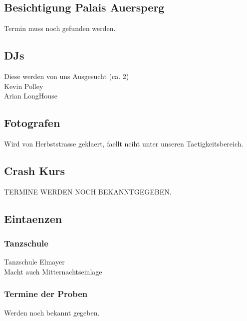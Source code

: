 \documentclass[12pt]{article}
\begin{document}
\subsection{Besichtigung Palais Auersperg}
Termin muss noch gefunden werden. 
\subsection{DJs}
Diese werden von uns Ausgesucht (ca. 2) \\
Kevin Polley \\
Arian LongHouse  \\
\subsection{Fotografen}
Wird von Herbststrasse geklaert, faellt nciht unter unseren Taetigkeitsbereich.
\subsection{Crash Kurs}
TERMINE WERDEN NOCH BEKANNTGEGEBEN.	
\subsection{Eintaenzen}
\subsubsection{Tanzschule}
Tanzschule Elmayer \\
Macht auch Mitternachtseinlage
\subsubsection{Termine der Proben}
Werden noch bekannt gegeben.
\end{document}
